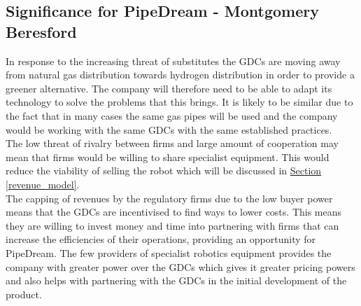 \documentclass[11pt]{article}		%
\newcommand{\sectref}[1]{\hyperref[#1]{Section \ref*{#1}}}     %
\begin{document}
               \subsection{Significance for PipeDream - Montgomery Beresford}
                In response to the increasing threat of substitutes the GDCs are moving away from natural gas distribution towards hydrogen distribution in order to provide a greener alternative. The company will therefore need to be able to adapt its technology to solve the problems that this brings. It is likely to be similar due to the fact that in many cases the same gas pipes will be used and the company would be working with the same GDCs with the same established practices.
                \\ \hspace*{3ex}
                The low threat of rivalry between firms and large amount of cooperation may mean that firms would be willing to share specialist equipment. This would  reduce the viability of selling the robot which will be discussed in \sectref{revenue_model}. 
               \\ \hspace*{3ex}
                The capping of revenues by the regulatory firms due to the low buyer power means that the GDCs are incentivised to find ways to lower costs. This means they are willing to invest money and time into partnering with firms that can increase the efficiencies of their operations, providing an opportunity for PipeDream.
                The few providers of specialist robotics equipment provides the company with greater power over the GDCs which gives it greater pricing powers and also helps with partnering with the GDCs in the initial development of the product.
       
\end{document}
